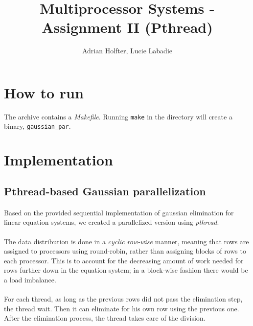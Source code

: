 \documentclass[]{article}
\title{Multiprocessor Systems - Assignment II (Pthread)}
\author{Adrian Holfter, Lucie Labadie}
\begin{document}
\maketitle

\section{How to run}

\paragraph{} The archive contains a \emph{Makefile}. Running \texttt{make} in the directory will create a binary, \texttt{gaussian\_par}.

\section{Implementation}

\subsection{Pthread-based Gaussian parallelization}

\paragraph{} Based on the provided sequential implementation of gaussian elimination for linear equation systems, we created a parallelized version using \emph{pthread}.

\paragraph{} The data distribution is done in a \emph{cyclic row-wise} manner, meaning that rows are assigned to processors using round-robin, rather than assigning blocks of rows to each processor. This is to account for the decreasing amount of work needed for rows further down in the equation system; in a block-wise fashion there would be a load imbalance. 

\paragraph{} For each thread, as long as the previous rows did not pass the elimination step, the thread wait. Then it can eliminate for his own row using the previous one. After the elimination process, the thread takes care of the division. 
\end{document}
